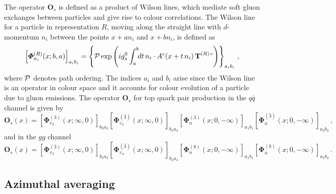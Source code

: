 \documentclass[a4paper,11pt]{article}
\newcommand{\qqbar}{{\ensuremath{q \bar q}}\xspace}
\newcommand{\calP}{{\cal P}}
\def\cT{\bm{\mathrm{T}}}
\numberwithin{equation}{section}
\begin{document}
The operator $\mathbold{O}_s$ is defined as a product of Wilson lines, which
mediate soft gluon exchanges between particles and give rise to colour
correlations.
% 
The Wilson line for a particle in representation $R$, moving along the straight
line with $d$-momentum $n_i$ between the points $x+a n_i$ and $x+b n_i$, is
defined as~\cite{Czakon:2013hxa}
%
\begin{equation}
  \left[\mathbold{\Phi}_{n_i}^{(R)} (x; b, a)\right]_{a_i b_i} =
  \left\{
  \calP 
  \exp 
  \left( i g_s^0 \int_a^b\!\! dt\, n_i \cdot 
  A^c(x+t\, n_i)\, \cT^{(R)\, c}
  \right)
  \right\}_{a_i b_i}
  \,,
\end{equation}
%
where $\calP$ denotes path ordering. The indices $a_i$ and $b_i$ arise since the
Wilson line is an operator in colour space and it accounts for colour evolution
of a particle due to gluon emissions.
%
The operator $\mathbold{O}_s$ for top quark pair production in the
\qqbar channel is given by
%
\begin{equation}
  \mathbold{O}_s(x) = 
  \left[\mathbold{\Phi}_{v_3}^{(3)} (x; \infty, 0)\right]_{b_3 a_3} 
  \left[\mathbold{\Phi}_{v_4}^{(\bar 3)} (x; \infty, 0)\right]_{b_4 a_4} 
  \left[\mathbold{\Phi}_{n}^{(3)} (x; 0, -\infty)\right]_{a_1 b_1} 
  \left[\mathbold{\Phi}_{\bar n}^{(\bar 3)} (x; 0, -\infty)\right]_{a_2 b_2} \,,
  \label{eq:Osqqdef}
\end{equation}
%
and in the $gg$ channel
%
\begin{equation}
  \mathbold{O}_s(x) = 
  \left[\mathbold{\Phi}_{v_3}^{(3)} (x; \infty, 0)\right]_{b_3 a_3} 
  \left[\mathbold{\Phi}_{v_4}^{(\bar 3)} (x; \infty, 0)\right]_{b_4 a_4} 
  \left[\mathbold{\Phi}_{n}^{(8)} (x; 0, -\infty)\right]_{a_1 b_1} 
  \left[\mathbold{\Phi}_{\bar n}^{(8)} (x; 0, -\infty)\right]_{a_2 b_2} \,.
  \label{eq:Osggdef}
\end{equation}

\subsection{Azimuthal averaging}
\end{document}
